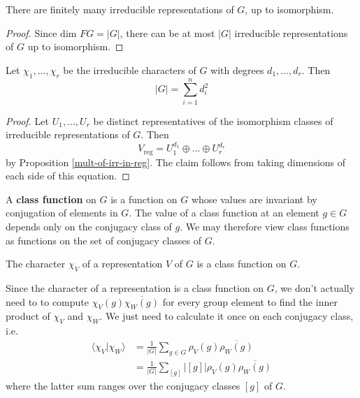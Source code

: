 \begin{cor}
There are finitely many irreducible representations of $G$, up to isomorphism.
\end{cor}
\begin{proof}
Since $\text{dim } FG = |G|$, there can be at most $|G|$ irreducible representations of $G$ up to isomorphism.
\end{proof}


\begin{cor}
Let $\chi_1, \ldots, \chi_r$ be the irreducible characters of $G$ with degrees $d_1, \ldots, d_r$.  Then
\[ |G| = \sum_{i=1}^n d_i^2 \]
\end{cor}
\begin{proof}
Let $U_1, \ldots, U_r$ be distinct representatives of the isomorphism classes of irreducible representations of $G$.  Then
\[ V_{\text{reg}} = U_1 ^ {d_1} \oplus \ldots \oplus U_r ^{d_r} \]
by Proposition \ref{mult-of-irr-in-reg}.  The claim follows from taking dimensions of each side of this equation.
\end{proof}


\begin{defn}
A \textbf{class function} on $G$ is a function on $G$ whose values are invariant by conjugation of elements in $G$.  The value of a class function at an element $g \in G$ depends only on the conjugacy class of $g$.  We may therefore view class functions as functions on the set of conjugacy classes of $G$.
\end{defn}
\begin{note}
The character $\chi_V$ of a representation $V$ of $G$ is a class function on $G$.
\end{note}
Since the character of a representation is a class function on $G$, we don't actually need to to compute $\chi_V (g) \overline {\chi_W (g)}$ for every group element to find the inner product of $\chi_V$ and $\chi_W$.  We just need to calculate it once on each conjugacy class, i.e. 
\begin{align*}
\langle \chi_V | \chi_W \rangle &= \frac{1}{|G|} \sum_{g \in G} \rho_V (g) \overline{\rho_W (g)} \\
&=  \frac{1}{|G|} \sum_{[g]} |[g]|   \rho_V (g) \overline{\rho_W (g)}
\end{align*}
where the latter sum ranges over the conjugacy classes $[g]$ of $G$.

